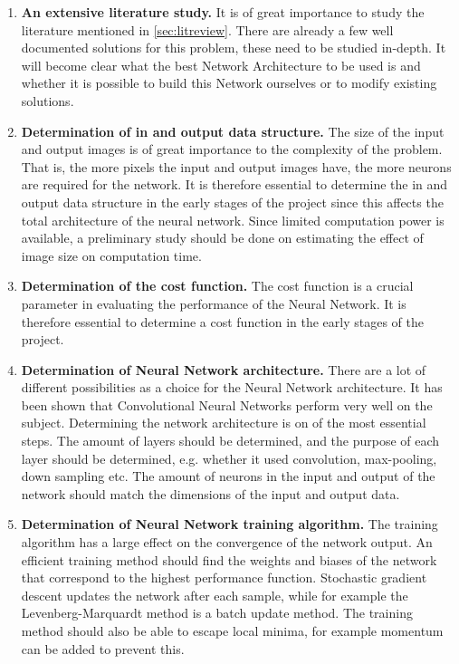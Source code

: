 \begin{enumerate}
\item	\textbf{An extensive literature study.}
It is of great importance to study the literature mentioned in \ref{sec:litreview}. There are already a few well documented solutions for this problem, these need to be studied in-depth. It will become clear what the best Network Architecture to be used is and whether it is possible to build this Network ourselves or to modify existing solutions.

\item \textbf{Determination of in and output data structure.}
The size of the input and output images is of great importance to the complexity of the problem. That is, the more pixels the input and output images have, the more neurons are required for the network. It is therefore essential to determine the in and output data structure in the early stages of the project since this affects the total architecture of the neural network. Since limited computation power is available, a preliminary study should be done on estimating the effect of image size on computation time. 

\item \textbf{Determination of the cost function.}
The cost function is a crucial parameter in evaluating the performance of the Neural Network. It is therefore essential to determine a cost function in the early stages of the project.

\item \textbf{Determination of Neural Network architecture.}
There are a lot of different possibilities as a choice for the Neural Network architecture. It has been shown \cite{AutomaticColorization} that Convolutional Neural Networks perform very well on the subject. Determining the network architecture is on of the most essential steps. The amount of layers should be determined, and the purpose of each layer should be determined, e.g. whether it used convolution, max-pooling, down sampling etc. The amount of neurons in the input and output of the network should match the dimensions of the input and output data. 

\item \textbf{Determination of Neural Network training algorithm.}
The training algorithm has a large effect on the convergence of the network output. An efficient training method should find the  weights and biases of the network that correspond to the highest performance function. Stochastic gradient descent updates the network after each sample, while for example the Levenberg-Marquardt method is a batch update method. The training method should also be able to escape local minima, for example momentum can be added to prevent this.


\end{enumerate}

